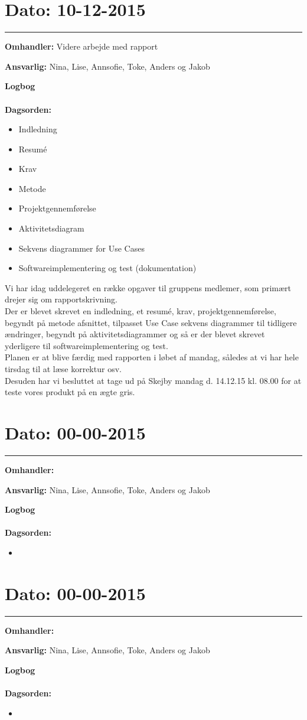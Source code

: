 	
	
\section{Dato: 10-12-2015 }
\hrule

\textbf{Omhandler:} Videre arbejde med rapport

\textbf{Ansvarlig:} Nina, Lise, Annsofie, Toke, Anders og Jakob

\textbf{Logbog}
\\
\\
\textbf{Dagsorden:}
\begin{itemize}
	\item Indledning
	\item Resumé
	\item Krav
	\item Metode
	\item Projektgennemførelse
	\item Aktivitetsdiagram
	\item Sekvens diagrammer for Use Cases
	\item Softwareimplementering og test (dokumentation)
\end{itemize}

Vi har idag uddelegeret en række opgaver til gruppens medlemer, som primært drejer sig om rapportskrivning. \\
Der er blevet skrevet en indledning, et resumé, krav, projektgennemførelse, begyndt på metode afsnittet, tilpasset Use Case sekvens diagrammer til tidligere ændringer, begyndt på aktivitetsdiagrammer og så er der blevet skrevet yderligere til softwareimplementering og test.\\
Planen er at blive færdig med rapporten i løbet af mandag, således at vi har hele tirsdag til at læse korrektur osv.\\
Desuden har vi besluttet at tage ud på Skejby mandag d. 14.12.15 kl. 08.00 for at teste vores produkt på en ægte gris. 


	
	
\section{Dato: 00-00-2015 }
\hrule

\textbf{Omhandler:} 

\textbf{Ansvarlig:} Nina, Lise, Annsofie, Toke, Anders og Jakob

\textbf{Logbog}
\\
\\
\textbf{Dagsorden:}
\begin{itemize}
	\item 
\end{itemize}


	
	
\section{Dato: 00-00-2015 }
\hrule

\textbf{Omhandler:} 

\textbf{Ansvarlig:} Nina, Lise, Annsofie, Toke, Anders og Jakob

\textbf{Logbog}
\\
\\
\textbf{Dagsorden:}
\begin{itemize}
	\item 
\end{itemize}
